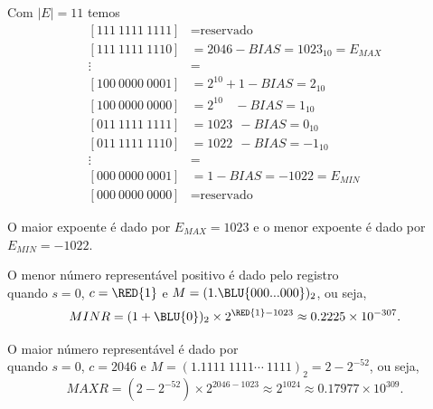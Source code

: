 Com $|E| = 11$ temos
\begin{equation}
  \begin{split}
 [111~1111~1111] &= \text{reservado}\\
 [111~1111~1110] &= 2046-BIAS      = 1023_{10}= E_{MAX}\\
     \vdots      &=  \\
 [100~0000~0001] &= 2^{10}+1  -BIAS =  2_{10} \\
 [100~0000~0000] &= 2^{10}~~~~-BIAS =  1_{10} \\
 [011~1111~1111] &= 1023   ~~ -BIAS =  0_{10} \\
 [011~1111~1110] &= 1022   ~~ -BIAS = -1_{10} \\
     \vdots      &=  \\
 [000~0000~0001] &= 1-BIAS = -1022 = E_{MIN}\\
 [000~0000~0000] &= \text{reservado}
  \end{split}
\end{equation}

O maior expoente é dado por $E_{MAX}=1023$ e o menor expoente é dado por $E_{MIN}=-1022$.

O menor número representável positivo é dado pelo registro
\begin{equation}
[0|000~0000~000\RED{1} |\BLU{0000~0000~0000\ldots 0000~0000}]
\end{equation}
quando $s=0$, $c=\RED{1}$ e $M=(1.\BLU{000...000})_2$, ou seja,
\begin{equation}
MINR=(1+\BLU{0})_2\times 2^{\RED{1}-1023} \approx 0.2225\times 10^{-307}.
\end{equation}

O maior número representável é dado por
\begin{equation}
[0|\RED{111~1111~1110} |\BLU{1111~1111~\cdots~1111~1111}]
\end{equation}
quando $s=0$, $c=2046$ e $M=(1.1111~1111\cdots~1111)_2=2-2^{-52}$, ou seja,
\begin{equation}
MAXR=(2-2^{-52})\times 2^{2046-1023} \approx 2^{1024}\approx0.17977\times 10^{309}.
\end{equation}

